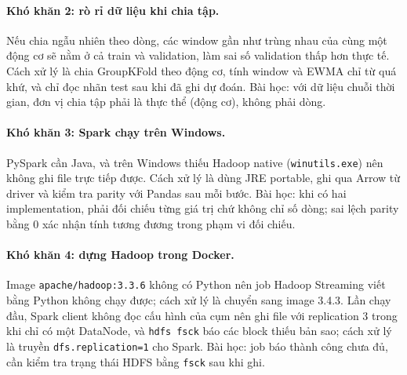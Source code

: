 \paragraph{Khó khăn 2: rò rỉ dữ liệu khi chia tập.} Nếu chia ngẫu nhiên theo dòng,
các window gần như trùng nhau của cùng một động cơ sẽ nằm ở cả train và
validation, làm sai số validation thấp hơn thực tế. Cách xử lý là chia GroupKFold theo động cơ, tính
window và EWMA chỉ từ quá khứ, và chỉ đọc nhãn test sau khi đã ghi dự đoán. Bài học:
với dữ liệu chuỗi thời gian, đơn vị chia tập phải là thực thể (động cơ), không phải
dòng.

\paragraph{Khó khăn 3: Spark chạy trên Windows.} PySpark cần Java, và trên Windows
thiếu Hadoop native (\texttt{winutils.exe}) nên không ghi file trực tiếp được. Cách xử lý là dùng
JRE portable, ghi qua Arrow từ driver và kiểm tra parity với Pandas sau mỗi bước.
Bài học: khi có hai implementation, phải đối chiếu từng giá trị chứ không chỉ số
dòng; sai lệch parity bằng 0 xác nhận tính tương đương trong phạm vi đối chiếu.

\paragraph{Khó khăn 4: dựng Hadoop trong Docker.} Image \texttt{apache/hadoop:3.3.6}
không có Python nên job Hadoop Streaming viết bằng Python không chạy được; cách xử
lý là chuyển sang image 3.4.3. Lần chạy đầu, Spark client không đọc cấu hình của cụm
nên ghi file với replication 3 trong khi chỉ có một DataNode, và \texttt{hdfs fsck}
báo các block thiếu bản sao; cách xử lý là truyền \texttt{dfs.replication=1} cho
Spark. Bài học: job báo thành công chưa đủ, cần kiểm tra trạng thái HDFS bằng
\texttt{fsck} sau khi ghi.

